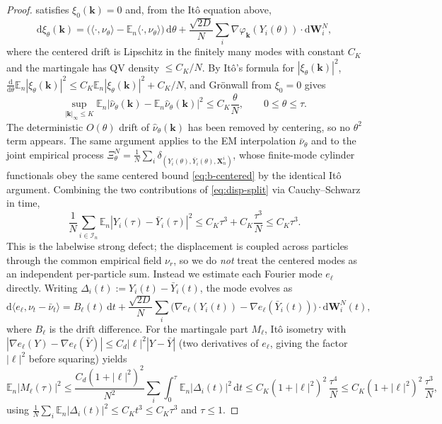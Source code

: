 \documentclass[a4paper,fleqn]{cas-sc}
\theoremstyle{definition}
\theoremstyle{remark}
\begin{document}
\begin{proof}
satisfies $\xi_0(\mathbf k)=0$ and, from the It\^o equation above,
\[
\mathrm d\xi_\theta(\mathbf k)
=\bigl(\langle\cdot,\nu_\theta\rangle-\mathbb E_n\langle\cdot,\nu_\theta\rangle\bigr)\,\mathrm d\theta
+\frac{\sqrt{2D}}N\sum_i\nabla\varphi_{\mathbf k}(Y_i(\theta))\!\cdot\!\mathrm d\mathbf W^N_i,
\]
where the centered drift is Lipschitz in the finitely many modes with constant
$C_K$ and the martingale has QV density $\le C_K/N$. By It\^o's formula for
$|\xi_\theta(\mathbf k)|^2$, $\frac{\mathrm d}{\mathrm d\theta}
\mathbb E_n|\xi_\theta(\mathbf k)|^2\le C_K\mathbb E_n|\xi_\theta(\mathbf k)|^2+C_K/N$,
and Gr\"onwall from $\xi_0=0$ gives
\begin{equation}\label{eq:b-centered}
\sup_{|\mathbf k|_\infty\le K}\mathbb E_n|\hat\nu_\theta(\mathbf k)-\mathbb E_n\hat\nu_\theta(\mathbf k)|^2
\le C_K\frac\theta N,
\qquad 0\le\theta\le\tau.
\end{equation}
The deterministic $O(\theta)$ drift of $\hat\nu_\theta(\mathbf k)$ has been
removed by centering, so no $\theta^2$ term appears. The same argument applies to
the EM interpolation $\bar\nu_\theta$ and to the joint empirical process
$\Xi^N_\theta=\frac1N\sum_i\delta_{(Y_i(\theta),\bar Y_i(\theta),\mathbf X^i_n)}$,
whose finite-mode cylinder functionals obey the same centered bound
\eqref{eq:b-centered} by the identical It\^o argument.
Combining the two contributions of \eqref{eq:disp-split} via Cauchy--Schwarz in
time,
\[
\frac1N\sum_{i\in\mathcal I_n}\mathbb E_n|Y_i(\tau)-\bar Y_i(\tau)|^2
\le C_K\tau^3+C_K\frac{\tau^3}{N}\le C_K\tau^3.
\]
This is the labelwise strong defect; the displacement is coupled across particles
through the common empirical field $\nu_r$, so we do \emph{not} treat the centered
modes as an independent per-particle sum. Instead we estimate each Fourier mode
$e_\ell$ directly. Writing $\Delta_i(t):=Y_i(t)-\bar Y_i(t)$, the mode evolves as
\[
\mathrm d\langle e_\ell,\nu_t-\bar\nu_t\rangle
=B_\ell(t)\,\mathrm dt
+\frac{\sqrt{2D}}N\sum_{i}\bigl(\nabla e_\ell(Y_i(t))-\nabla e_\ell(\bar Y_i(t))\bigr)\!\cdot\!\mathrm d\mathbf W^N_i(t),
\]
where $B_\ell$ is the drift difference. For the martingale part $M_\ell$, It\^o
isometry with $|\nabla e_\ell(Y)-\nabla e_\ell(\bar Y)|\le C_d|\ell|^2|Y-\bar Y|$
(two derivatives of $e_\ell$, giving the factor $|\ell|^2$ before squaring) yields
\[
\mathbb E_n|M_\ell(\tau)|^2
\le\frac{C_d(1+|\ell|^2)^2}{N^2}\sum_i\int_0^\tau\mathbb E_n|\Delta_i(t)|^2\,\mathrm dt
\le C_K(1+|\ell|^2)^2\,\frac{\tau^4}{N}
\le C_K(1+|\ell|^2)^2\,\frac{\tau^3}{N},
\]
using $\frac1N\sum_i\mathbb E_n|\Delta_i(t)|^2\le C_Kt^3\le C_K\tau^3$ and $\tau\le1$.

\end{proof}
\end{document}
